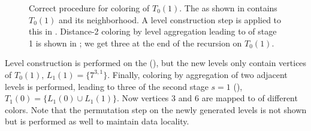 \begin{figure}[t]
     	\centering
     	\hspace{0.6em}
     	\hspace{0.6em}
     	\hspace{0.6em}
     	\hspace{0.6em}
     	\caption{Correct procedure for \DTWO coloring of \levelGroup
          $T_0(1)$. The \subgraph as shown in 
          contains \levelGroup $T_0(1)$ and its \DONE neighborhood. A level
          construction step is applied to this \subgraph in
          . Distance-2 coloring by level aggregation
          leading to \levelGroups of stage 1 is shown in
          ; we get three \levelGroups at the end of
          the recursion on $T_0(1)$.}
     	\label{fig:rec_d2_correct}
     \end{figure}
Level construction is performed on the \subgraph (),
but the new levels only contain vertices of $T_0(1)$, \ie $L_1(1) =
\{7^{3,1}\}$. Finally, \DTWO coloring by aggregation of two adjacent levels is
performed, leading to three \levelGroups of the second stage $s=1$
(), \ie $T_1(0)=\{L_1(0) \cup L_1(1)\}$.  Now
vertices $3$ and $6$ are mapped to \levelGroups of different colors. Note that
the permutation step on the newly generated levels is not shown but is performed
as well to maintain data locality.
    

